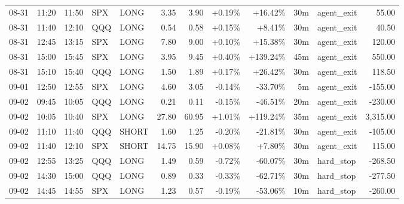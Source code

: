 \documentclass[11pt,a4paper,twoside]{article}
\begin{document}
\begin{center}
\begin{longtable}{>{\color{txtmain}}l l l l l r r r r r >{\color{txtmain}}l r}
08-31 & 11:20 & 11:50 & SPX & LONG & 3.35 & 3.90 & \textcolor{wingreen}{+0.19\%} & \textcolor{wingreen}{+16.42\%} & 30m & agent\_exit & \textcolor{wingreen}{55.00} \\
08-31 & 11:40 & 12:10 & QQQ & LONG & 0.54 & 0.58 & \textcolor{wingreen}{+0.15\%} & \textcolor{wingreen}{+8.41\%} & 30m & agent\_exit & \textcolor{wingreen}{40.50} \\
08-31 & 12:45 & 13:15 & SPX & LONG & 7.80 & 9.00 & \textcolor{wingreen}{+0.10\%} & \textcolor{wingreen}{+15.38\%} & 30m & agent\_exit & \textcolor{wingreen}{120.00} \\
08-31 & 15:00 & 15:45 & SPX & LONG & 3.95 & 9.45 & \textcolor{wingreen}{+0.40\%} & \textcolor{wingreen}{+139.24\%} & 45m & agent\_exit & \textcolor{wingreen}{550.00} \\
08-31 & 15:10 & 15:40 & QQQ & LONG & 1.50 & 1.89 & \textcolor{wingreen}{+0.17\%} & \textcolor{wingreen}{+26.42\%} & 30m & agent\_exit & \textcolor{wingreen}{118.50} \\
09-01 & 12:50 & 12:55 & SPX & LONG & 4.60 & 3.05 & \textcolor{lossred}{-0.14\%} & \textcolor{lossred}{-33.70\%} & 5m & agent\_exit & \textcolor{lossred}{-155.00} \\
09-02 & 09:45 & 10:05 & QQQ & LONG & 0.21 & 0.11 & \textcolor{lossred}{-0.15\%} & \textcolor{lossred}{-46.51\%} & 20m & agent\_exit & \textcolor{lossred}{-230.00} \\
09-02 & 10:05 & 10:40 & SPX & LONG & 27.80 & 60.95 & \textcolor{wingreen}{+1.01\%} & \textcolor{wingreen}{+119.24\%} & 35m & agent\_exit & \textcolor{wingreen}{3,315.00} \\
09-02 & 11:10 & 11:40 & QQQ & SHORT & 1.60 & 1.25 & \textcolor{lossred}{-0.20\%} & \textcolor{lossred}{-21.81\%} & 30m & agent\_exit & \textcolor{lossred}{-105.00} \\
09-02 & 11:40 & 12:10 & SPX & SHORT & 14.75 & 15.90 & \textcolor{wingreen}{+0.08\%} & \textcolor{wingreen}{+7.80\%} & 30m & agent\_exit & \textcolor{wingreen}{115.00} \\
09-02 & 12:55 & 13:25 & QQQ & LONG & 1.49 & 0.59 & \textcolor{lossred}{-0.72\%} & \textcolor{lossred}{-60.07\%} & 30m & hard\_stop & \textcolor{lossred}{-268.50} \\
09-02 & 14:30 & 15:00 & QQQ & LONG & 0.89 & 0.33 & \textcolor{lossred}{-0.33\%} & \textcolor{lossred}{-62.71\%} & 30m & hard\_stop & \textcolor{lossred}{-277.50} \\
09-02 & 14:45 & 14:55 & SPX & LONG & 1.23 & 0.57 & \textcolor{lossred}{-0.19\%} & \textcolor{lossred}{-53.06\%} & 10m & hard\_stop & \textcolor{lossred}{-260.00} \\

\end{longtable}
\end{center}
\end{document}
